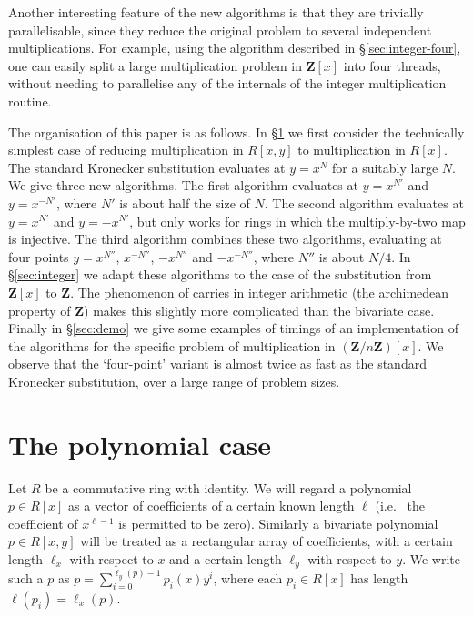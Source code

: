 \documentclass{amsart}
\newcommand{\ZZ}{\mathbf{Z}}
\theoremstyle{definition}
\theoremstyle{remark}
\begin{document}
Another interesting feature of the new algorithms is that they are trivially parallelisable, since they reduce the original problem to several independent multiplications. For example, using the algorithm described in \S\ref{sec:integer-four}, one can easily split a large multiplication problem in $\ZZ[x]$ into four threads, without needing to parallelise any of the internals of the integer multiplication routine.

The organisation of this paper is as follows. In \S\ref{sec:polynomial} we first consider the technically simplest case of reducing multiplication in $R[x, y]$ to multiplication in $R[x]$. The standard Kronecker substitution evaluates at $y = x^N$ for a suitably large $N$. We give three new algorithms. The first algorithm evaluates at $y = x^{N'}$ and $y = x^{-N'}$, where $N'$ is about half the size of $N$. The second algorithm evaluates at $y = x^{N'}$ and $y = -x^{N'}$, but only works for rings in which the multiply-by-two map is injective. The third algorithm combines these two algorithms, evaluating at four points $y = x^{N''}$, $x^{-N''}$, $-x^{N''}$ and $-x^{-N''}$, where $N''$ is about $N/4$. In \S\ref{sec:integer} we adapt these algorithms to the case of the substitution from $\ZZ[x]$ to $\ZZ$. The phenomenon of carries in integer arithmetic (the archimedean property of $\ZZ$) makes this slightly more complicated than the bivariate case. Finally in \S\ref{sec:demo} we give some examples of timings of an implementation of the algorithms for the specific problem of multiplication in $(\ZZ/n\ZZ)[x]$. We observe that the `four-point' variant is almost twice as fast as the standard Kronecker substitution, over a large range of problem sizes.


\section{The polynomial case}
\label{sec:polynomial}

Let $R$ be a commutative ring with identity. We will regard a polynomial $p \in R[x]$ as a vector of coefficients of a certain known length $\ell$ (i.e.~ the coefficient of $x^{\ell-1}$ is permitted to be zero). Similarly a bivariate polynomial $p \in R[x, y]$ will be treated as a rectangular array of coefficients, with a certain length $\ell_x$ with respect to $x$ and a certain length $\ell_y$ with respect to $y$. We write such a $p$ as $p = \sum_{i=0}^{\ell_y(p) - 1} p_i(x) y^i$, where each $p_i \in R[x]$ has length $\ell(p_i) = \ell_x(p)$.
\end{document}
